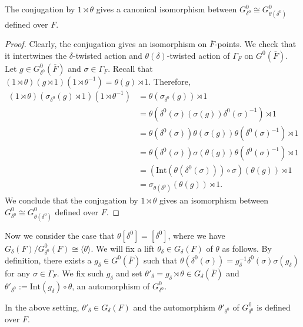 \documentclass[11pt,letterpaper]{amsart}
\numberwithin{equation}{section}
\begin{document}
\begin{lemma}\label{lem: F-point iso for non-fixed delta}
    The conjugation by $1 \rtimes \theta$ gives a canonical isomorphism between $G^0_{\delta^0} \cong G^0_{\theta(\delta^0)}$ defined over $F$.
\end{lemma}
\begin{proof}
Clearly, the conjugation gives an isomorphism on $\overline{F}$-points. We check that it intertwines the $\delta$-twisted action and $\theta(\delta)$-twisted action of $\Gamma_F$ on $G^0(\overline{F})$. Let $g\in G^0_{\delta^0} (\overline{F})$ and $\sigma\in\Gamma_F$. Recall that $(1\rtimes\theta)(g\rtimes 1)(1\rtimes\theta^{-1})=\theta(g)\rtimes 1.$ Therefore, 
\begin{align*}
(1\rtimes\theta)(\sigma_{\delta^0}(g)\rtimes 1)(1\rtimes\theta^{-1})&= \theta(\sigma_{\delta^0}(g))\rtimes 1 \\
&=\theta(\delta^0(\sigma)(\sigma(g))\delta^0(\sigma)^{-1})\rtimes 1 \\
&=\theta(\delta^0(\sigma))\theta(\sigma(g))\theta(\delta^0(\sigma)^{-1}) \rtimes 1 \\
&=\theta(\delta^0(\sigma))\sigma(\theta(g))\theta(\delta^0(\sigma)^{-1}) \rtimes 1 \\
&=(\mathrm{Int}(\theta(\delta^0(\sigma)))\circ\sigma)(\theta(g)) \rtimes 1 \\
&=\sigma_{\theta(\delta^0)}(\theta(g)) \rtimes 1.
\end{align*}
We conclude that the conjugation by $1 \rtimes \theta$ gives an isomorphism between $G^0_{\delta^0} \cong G^0_{\theta(\delta^0)}$ defined over $F$.
\end{proof}


Now we consider the case that $\theta[\delta^0] = [\delta^0]$, where we have $G_{\delta}(F)/ G^0_{\delta^0}(F) \cong \langle \theta \rangle$. We will fix a lift $\theta_{\delta} \in G_\delta(F)$ of $\theta$ as follows. By definition, there exists a $g_\delta\in G^0(\overline{F})$ such that $\theta(\delta^0(\sigma))=g_\delta^{-1}\delta^0(\sigma)\sigma(g_\delta)$ for any $\sigma\in\Gamma_F.$ We fix such $g_\delta$ and set $\theta'_{\delta} = g_{\delta} \rtimes \theta \in G_{\delta}(\overline{F})$ and
$\theta'_{\delta^0}:=\mathrm{Int}(g_\delta)\circ\theta$, an automorphism of $G^0_{\delta^0}$.



\begin{lemma}\label{lemma: automorphism preserves Borel}
   In the above setting, $\theta'_{\delta}\in G_{\delta}(F)$ and the automorphism $\theta'_{\delta^0}$ of $G^0_{\delta^0}$ is defined over $F$. 
\end{lemma}
\end{document}
